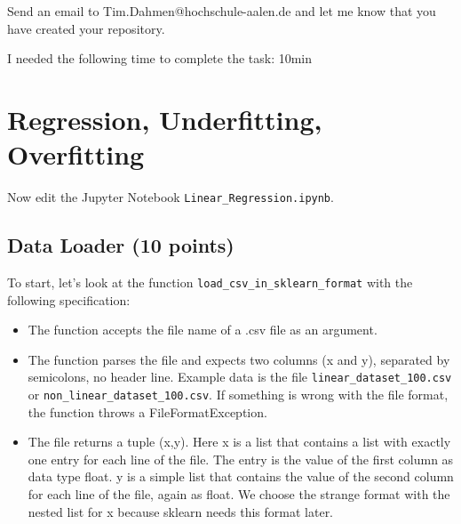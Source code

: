 \documentclass{article}
\begin{document}
Send an email to Tim.Dahmen@hochschule-aalen.de and let me know that you have created your repository. 

I needed the following time to complete the task: 10min

\section{Regression, Underfitting, Overfitting}

Now edit the Jupyter Notebook \texttt{Linear\_Regression.ipynb}.

\subsection{Data Loader (10 points)}

To start, let's look at the function \texttt{load\_csv\_in\_sklearn\_format} with the following specification:

\begin{itemize}
\item The function accepts the file name of a .csv file as an argument.
\item The function parses the file and expects two columns (x and y), separated by semicolons, no header line. Example data is the file \texttt{linear\_dataset\_100.csv} or \texttt{non\_linear\_dataset\_100.csv}. If something is wrong with the file format, the function throws a FileFormatException.
\item The file returns a tuple (x,y). Here x is a list that contains a list with exactly one entry for each line of the file. The entry is the value of the first column as data type float. y is a simple list that contains the value of the second column for each line of the file, again as float. We choose the strange format with the nested list for x because sklearn needs this format later.
\end{itemize}
\end{document}
